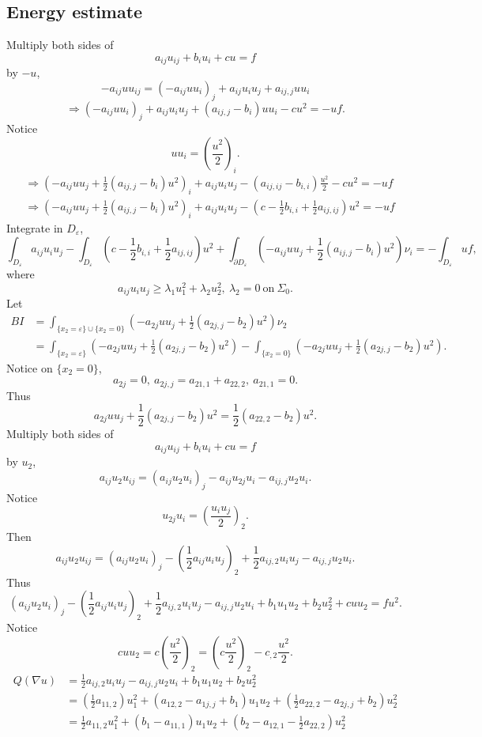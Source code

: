 \documentclass[12pt]{article}
\begin{document}
\subsection{Energy estimate}
Multiply both sides of 
\[ a_{ij}u_{ij}+b_iu_i + cu = f \]
by $-u$,
\[ -a_{ij}uu_{ij} = (-a_{ij}uu_i)_j + a_{ij}u_iu_j+a_{ij, j}uu_i \]
\[\Rightarrow (-a_{ij}uu_i)_j+a_{ij}u_iu_j+(a_{ij, j}-b_i)uu_i-cu^2=-uf. \]
Notice
\[ uu_i=\left(\frac{u^2}{2} \right)_i. \]
\begin{align*}
&\Rightarrow \left(-a_{ij}uu_j+\frac{1}{2}(a_{ij, j}-b_i)u^2 \right)_i+a_{ij}u_iu_j-(a_{ij, ij}-b_{i, i})\frac{u^2}{2}-cu^2=-uf \\
&\Rightarrow \left(-a_{ij}uu_j+\frac{1}{2}(a_{ij, j}-b_i)u^2 \right)_i+a_{ij}u_iu_j- \left( c-\frac{1}{2}b_{i, i}+\frac{1}{2}a_{ij, ij} \right)u^2 =-uf
\end{align*}
Integrate in $D_\varepsilon$,
\[\int_{D_\varepsilon}a_{ij}u_iu_j-\int_{D_\varepsilon}\left(c-\frac{1}{2}b_{i, i}+\frac{1}{2}a_{ij, ij} \right)u^2+\int_{\partial D_\varepsilon}\left(-a_{ij}uu_j+\frac{1}{2}(a_{ij, j}-b_i)u^2 \right)\nu_i=-\int_{D_\varepsilon}uf, \]
where 
\[a_{ij}u_iu_j \ge \lambda_1u_1^2+\lambda_2u_2^2,\ \lambda_2 = 0\mathrm{\ on\ }\Sigma_0. \]
Let
\begin{align*}
BI &= \int_{\{x_2 = \varepsilon \}\cup\{x_2 = 0 \}}\left(-a_{2j}uu_j+\frac{1}{2}(a_{2j,j}-b_2)u^2 \right)\nu_2 \\
&= \int_{\{x_2=\varepsilon \}}\left(-a_{2j}uu_j+\frac{1}{2}(a_{2j, j}-b_2)u^2 \right)-\int_{\{x_2=0\}}\left(-a_{2j}uu_j+\frac{1}{2}(a_{2j, j}-b_2)u^2 \right).
\end{align*}
Notice on $\{x_2=0 \}$,
\[a_{2j}=0,\ a_{2j, j}=a_{21, 1}+a_{22, 2},\ a_{21, 1}=0. \]
Thus
\[a_{2j}uu_j+\frac{1}{2}(a_{2j, j}-b_2)u^2=\frac{1}{2}(a_{22,2}-b_2)u^2. \]
Multiply both sides of 
\[a_{ij}u_{ij}+b_iu_i+cu=f \]
by $u_2$,
\[a_{ij}u_2u_{ij}=(a_{ij}u_2u_i)_j-a_{ij}u_{2j}u_i-a_{ij, j}u_2u_i. \]
Notice 
\[u_{2j}u_i=\left(\frac{u_iu_j}{2} \right)_2 .\]
Then
\[a_{ij}u_2u_{ij}=(a_{ij}u_2u_i)_j-\left(\frac{1}{2}a_{ij}u_iu_j \right)_2+\frac{1}{2}a_{ij, 2}u_iu_j-a_{ij, j}u_2u_i. \]
Thus
\[(a_{ij}u_2u_i)_j-\left(\frac{1}{2}a_{ij}u_iu_j \right)_2+\frac{1}{2}a_{ij,2}u_iu_j-a_{ij,j}u_2u_i+ b_1u_1u_2+b_2u_2^2+cuu_2=fu^2.  \]
Notice 
\[cuu_2=c\left(\frac{u^2}{2} \right)_2=\left(c\frac{u^2}{2} \right)_2-c_{,2}\frac{u^2}{2}. \]
\begin{align*}
Q(\nabla u)&=\frac{1}{2}a_{ij, 2}u_iu_j-a_{ij, j}u_2u_i+b_1u_1u_2+b_2u_2^2\\
&=\left(\frac{1}{2}a_{11,2} \right)u_1^2+(a_{12,2}-a_{1j,j}+b_1)u_1u_2+\left(\frac{1}{2}a_{22,2}-a_{2j,j}+b_2 \right)u^2_2\\
&=\frac{1}{2}a_{11,2}u_1^2+(b_1-a_{11,1})u_1u_2+\left(b_2-a_{12,1}-\frac{1}{2}a_{22,2} \right)u^2_2 
\end{align*}
\end{document}
